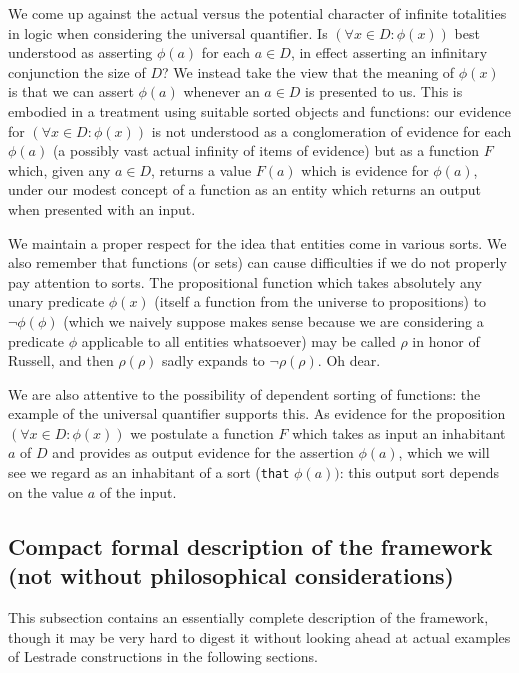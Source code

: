 \documentclass{article}
\begin{document}
We come up against the actual versus the potential character of infinite totalities in logic when considering the universal quantifier.  Is $(\forall x \in D:\phi(x))$ best understood as asserting $\phi(a)$ for each $a \in D$, in effect asserting an infinitary conjunction the size of $D$?
We instead take the view that the meaning of $\phi(x)$ is that we can assert $\phi(a)$ whenever an $a \in D$ is presented to us.  This is embodied in a treatment using suitable sorted objects and functions:   our evidence for $(\forall x \in D:\phi(x))$ is not understood as a conglomeration of evidence for each $\phi(a)$
(a possibly vast actual infinity of items of evidence) but as a function $F$ which, given any $a \in D$, returns a value $F(a)$ which is evidence for $\phi(a)$, under our modest concept of a function as an entity which returns an output when presented with an input.

We maintain a proper respect for the idea that entities come in various sorts.  We also remember that functions (or sets) can cause difficulties if we do not properly pay attention to sorts.  The propositional function which takes absolutely any unary predicate $\phi(x)$ (itself a function from the universe to propositions) to $\neg \phi(\phi)$ (which we naively suppose makes sense because we are considering a predicate $\phi$ applicable to all entities whatsoever) may be called $\rho$ in honor of Russell, and then $\rho(\rho)$ sadly expands to $\neg \rho(\rho)$.  Oh dear.

We are also attentive to the possibility of dependent sorting of functions:  the example of the universal quantifier supports this.  As evidence for
the proposition $(\forall x \in D:\phi(x))$ we postulate a function $F$ which takes as input an inhabitant $a$ of $D$ and provides as output evidence for the assertion $\phi(a)$, which we will see we regard as an inhabitant of a sort ({\tt that} $\phi(a))$:  this output sort depends on the value $a$ of the input.

\subsection{Compact formal description of the framework (not without philosophical considerations)}

This subsection contains an essentially complete description of the framework, though it may be very hard to digest it without looking ahead at actual examples of Lestrade constructions in the following sections.
\end{document}

